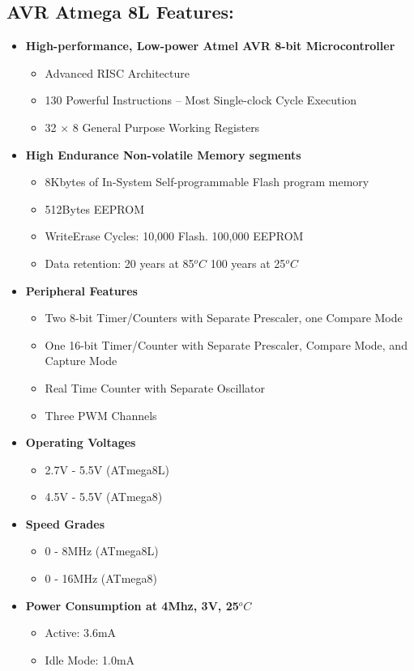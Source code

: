 \documentclass[12pt, a4paper]{article}
\begin{document}
\newpage
\begin{appendices}
\section{AVR Atmega 8L Features:}
\begin{itemize}
\item \textbf{High-performance, Low-power Atmel AVR 8-bit Microcontroller}
\begin{itemize}
\item Advanced \ac{RISC} Architecture
\item 130 Powerful Instructions – Most Single-clock Cycle Execution
\item 32 × 8 General Purpose Working Registers
\end{itemize}
\item \textbf{High Endurance Non-volatile Memory segments}
\begin{itemize}
\item 8Kbytes of In-System Self-programmable Flash program memory
\item 512Bytes EEPROM
\item WriteErase Cycles: 10,000 Flash. 100,000 \ac{EEPROM}
\item Data retention: 20 years at 85$^oC$ 100 years at 25$^oC$
\end{itemize}
\item \textbf{Peripheral Features}
\begin{itemize}
\item Two 8-bit Timer/Counters with Separate Prescaler, one Compare Mode
\item One 16-bit Timer/Counter with Separate Prescaler, Compare Mode, and Capture Mode
\item Real Time Counter with Separate Oscillator
\item Three PWM Channels
\end{itemize}

\item \textbf{Operating Voltages}
\begin{itemize}
\item 2.7V - 5.5V (ATmega8L)
\item 4.5V - 5.5V (ATmega8)
\end{itemize}
\item \textbf{Speed Grades}
\begin{itemize}
\item 0 - 8MHz (ATmega8L)
\item 0 - 16MHz (ATmega8)
\end{itemize}
\item \textbf{Power Consumption at 4Mhz, 3V, 25$^oC$}
\begin{itemize}
\item Active: 3.6mA
\item Idle Mode: 1.0mA
\end{itemize}
\end{itemize}
\newpage

\end{appendices}
\end{document}

